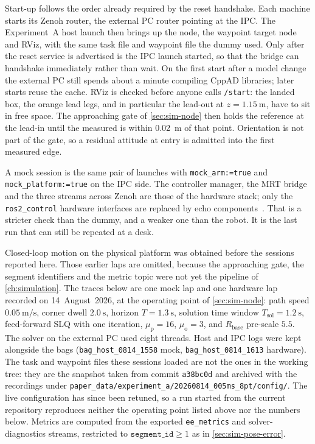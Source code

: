 Start-up follows the order already required by the reset handshake.
Each machine starts its Zenoh router, the external PC router pointing at
the IPC. The Experiment~A host launch then brings up the \mpc{} node, the
waypoint target node and RViz, with the same task file and waypoint file
the dummy used. Only after the reset service is advertised is the IPC
launch started, so that the bridge can handshake immediately rather than
wait. On the first start after a model change the external PC still
spends about a minute compiling CppAD libraries; later starts reuse the
cache. RViz is checked before anyone calls \texttt{/start}: the landed
box, the orange lead legs, and in particular the lead-out at
$z=\qty{1.15}{\meter}$, have to sit in free space. The approaching gate
of \cref{sec:sim-node} then holds the reference at the lead-in until the
measured \ee{} is within \qty{0.02}{\meter} of that point. Orientation
is not part of the gate, so a residual attitude at entry is admitted
into the first measured edge.

A mock session is the same pair of launches with
\texttt{mock\_arm:=true} and \texttt{mock\_platform:=true} on the IPC
side. The controller manager, the MRT bridge and the three \ocs{}
streams across Zenoh are those of the hardware stack; only the
\texttt{ros2\_control} hardware interfaces are replaced by echo
components~\cite{ros2control}. That is a stricter check than the dummy,
and a weaker one than the robot. It is the last run that can still be
repeated at a desk.

Closed-loop motion on the physical platform was obtained before the
sessions reported here. Those earlier laps are omitted, because the
approaching gate, the segment identifiers and the metric topic were not
yet the pipeline of \cref{ch:simulation}. The traces below are one mock
lap and one hardware lap recorded on 14~August~2026, at the operating
point of \cref{sec:sim-node}: path speed
$\qty{0.05}{\meter\per\second}$, corner dwell $\qty{2.0}{\second}$,
horizon $T=\qty{1.3}{\second}$, solution time window
$T_{\mathrm{sol}}=\qty{1.2}{\second}$, feed-forward SLQ with one
iteration, $\mu_{\mathrm{p}}=16$, $\mu_{\mathrm{o}}=3$, and
$R_{\mathrm{base}}$ pre-scale $5.5$. The solver on the external PC used
eight threads. Host and IPC logs were kept alongside the bags
(\texttt{bag\_host\_0814\_1558} mock,
\texttt{bag\_host\_0814\_1613} hardware). The task and waypoint files
these sessions loaded are not the ones in the working tree: they are
the snapshot taken from commit \texttt{a38bc0d} and archived with the
recordings under
\texttt{paper\_data/experiment\_a/20260814\_005ms\_8pt/config/}. The
live configuration has since been retuned, so a run started from the
current repository reproduces neither the operating point listed above
nor the numbers below. Metrics are computed from the
exported \texttt{ee\_metrics} and solver-diagnostics streams, restricted
to $\texttt{segment\_id}\ge 1$ as in \cref{sec:sim-pose-error}.

